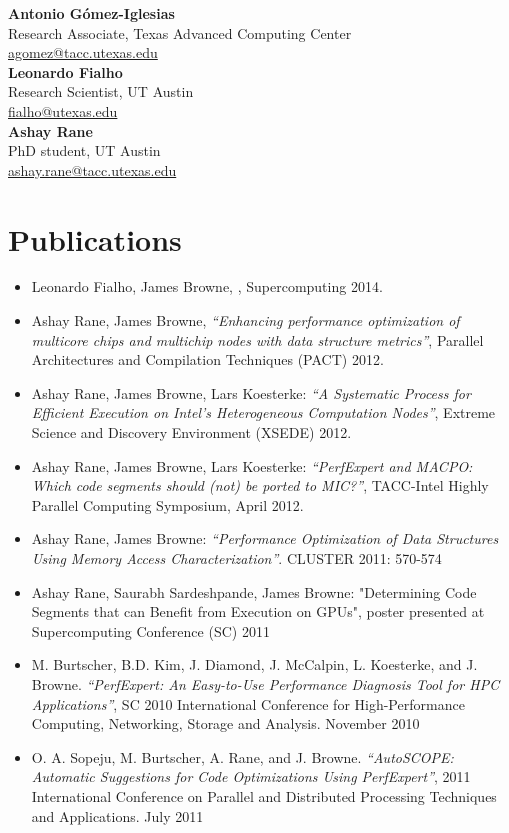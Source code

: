 \noindent\textbf{Antonio G\'{o}mez-Iglesias}\\
Research Associate, Texas Advanced Computing Center\\
\href{mailto:agomez@tacc.utexas.edu}{agomez@tacc.utexas.edu}\\

\noindent\textbf{Leonardo Fialho}\\
Research Scientist, UT Austin\\
\href{mailto:fialho@utexas.edu}{fialho@utexas.edu}\\

\noindent\textbf{Ashay Rane}\\
PhD student, UT Austin\\
\href{mailto:ashay.rane@tacc.utexas.edu}{ashay.rane@tacc.utexas.edu}

\section{Publications}

\begin{itemize}
        \item Leonardo Fialho, James Browne, , Supercomputing 2014.
	\item Ashay Rane, James Browne, \textit{``Enhancing performance optimization of multicore chips and multichip nodes with data structure metrics''}, Parallel Architectures and Compilation Techniques (PACT) 2012.
	\item Ashay Rane, James Browne, Lars Koesterke: \textit{``A Systematic Process for Efficient Execution on Intel's Heterogeneous Computation Nodes''}, Extreme Science and Discovery Environment (XSEDE) 2012.
	\item Ashay Rane, James Browne, Lars Koesterke: \textit{``PerfExpert and MACPO: Which code segments should (not) be ported to MIC?''}, TACC-Intel Highly Parallel Computing Symposium, April 2012.
	\item Ashay Rane, James Browne: \textit{``Performance Optimization of Data Structures Using Memory Access Characterization''}. CLUSTER 2011: 570-574
	\item Ashay Rane, Saurabh Sardeshpande, James Browne: "Determining Code Segments that can Benefit from Execution on GPUs", poster presented at Supercomputing Conference (SC) 2011
	\item M. Burtscher, B.D. Kim, J. Diamond, J. McCalpin, L. Koesterke, and J. Browne. \textit{``PerfExpert: An Easy-to-Use Performance Diagnosis Tool for HPC Applications''}, SC 2010 International Conference for High-Performance Computing, Networking, Storage and Analysis. November 2010
	\item O. A. Sopeju, M. Burtscher, A. Rane, and J. Browne. \textit{``AutoSCOPE: Automatic Suggestions for Code Optimizations Using PerfExpert''}, 2011 International Conference on Parallel and Distributed Processing Techniques and Applications. July 2011
\end{itemize}

